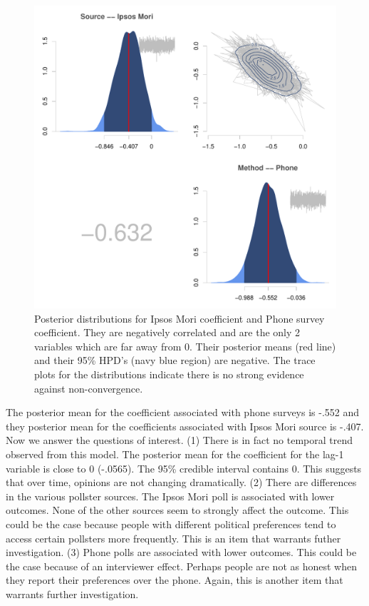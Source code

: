 \documentclass{../../tex_template/asaproc}
\begin{document}
\begin{figure}[H]
  \includegraphics[scale=.5]{figs/posts.pdf}
  \caption{\small Posterior distributions for Ipsos Mori coefficient and Phone survey coefficient.
  They are negatively correlated and are the only 2 variables which are far away from 0. Their
  posterior means (red line) and their 95\% HPD's (navy blue region) are negative. The trace plots 
  for the distributions indicate there is no strong evidence against non-convergence.}
  \label{fig:posts}
\end{figure}
The posterior mean for the coefficient associated with phone surveys is -.552
and they posterior mean for the coefficients associated with Ipsos Mori source
is -.407.\\

Now we answer the questions of interest. (1) There is in fact no temporal trend
observed from this model. The posterior mean for the coefficient for the lag-1
variable is close to 0 (-.0565). The 95\% credible interval contains 0. This 
suggests that over time, opinions are not changing dramatically.
(2) There are differences in the various pollster sources. The Ipsos Mori poll is
associated with lower outcomes. None of the other sources seem to strongly
affect the outcome. This could be the case because people with different political
preferences tend to access certain pollsters more frequently. This is an item
that warrants futher investigation. (3) Phone polls are associated with lower outcomes.
This could be the case because of an interviewer effect. Perhaps people are not as
honest when they report their preferences over the phone. Again, this is another
item that warrants further investigation.\\
\end{document}
